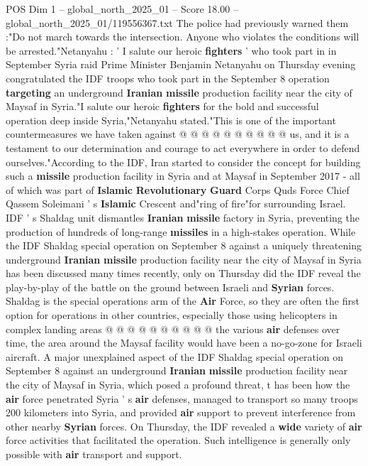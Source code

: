 \begin{textsample}{POS Dim 1 – global\_north\_2025\_01 – Score 18.00 – global\_north\_2025\_01/119556367.txt}
The police had previously warned them :"Do not march towards the intersection.
Anyone who violates the conditions will be arrested."Netanyahu : ' I salute our heroic \textbf{fighters} ' who took part in in September Syria raid Prime Minister Benjamin Netanyahu on Thursday evening congratulated the IDF troops who took part in the September 8 operation \textbf{targeting} an underground \textbf{Iranian} \textbf{missile} production facility near the city of Maysaf in Syria."I salute our heroic \textbf{fighters} for the bold and successful operation deep inside Syria,"Netanyahu stated."This is one of the important countermeasures we have taken against @ @ @ @ @ @ @ @ @ @ us, and it is a testament to our determination and courage to act everywhere in order to defend ourselves."According to the IDF, Iran started to consider the concept for building such a \textbf{missile} production facility in Syria and at Maysaf in September 2017 - all of which was part of \textbf{Islamic} \textbf{Revolutionary} \textbf{Guard} Corps Quds Force Chief Qassem Soleimani ' s \textbf{Islamic} Crescent and"ring of fire"for surrounding Israel.
IDF ' s Shaldag unit dismantles \textbf{Iranian} \textbf{missile} factory in Syria, preventing the production of hundreds of long-range \textbf{missiles} in a high-stakes operation.
While the IDF Shaldag special operation on September 8 against a uniquely threatening underground \textbf{Iranian} \textbf{missile} production facility near the city of Maysaf in Syria has been discussed many times recently, only on Thursday did the IDF reveal the play-by-play of the battle on the ground between Israeli and \textbf{Syrian} forces.
Shaldag is the special operations arm of the \textbf{Air} Force, so they are often the first option for operations in other countries, especially those using helicopters in complex landing areas @ @ @ @ @ @ @ @ @ @ the various \textbf{air} defenses over time, the area around the Maysaf facility would have been a no-go-zone for Israeli aircraft.
A major unexplained aspect of the IDF Shaldag special operation on September 8 against an underground \textbf{Iranian} \textbf{missile} production facility near the city of Maysaf in Syria, which posed a profound threat, t has been how the \textbf{air} force penetrated Syria ' s \textbf{air} defenses, managed to transport so many troops 200 kilometers into Syria, and provided \textbf{air} support to prevent interference from other nearby \textbf{Syrian} forces.
On Thursday, the IDF revealed a \textbf{wide} variety of \textbf{air} force activities that facilitated the operation.
Such intelligence is generally only possible with \textbf{air} transport and support.

\end{textsample}

